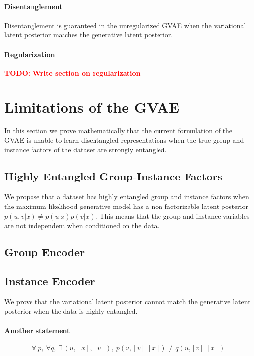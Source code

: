 \documentclass{article}
\newcommand{\todo}[1]{\textcolor{red}{\textbf{TODO: #1}}}
\begin{document}
\paragraph{Disentanglement} Disentanglement is guaranteed in the unregularized GVAE when the variational latent posterior matches the generative latent posterior.

\paragraph{Regularization}

\todo{Write section on regularization}

\section{Limitations of the GVAE}

In this section we prove mathematically that the current formulation of the GVAE is unable to learn disentangled representations when the true group and instance factors of the dataset are strongly entangled.

\subsection{Highly Entangled Group-Instance Factors}

We propose that a dataset has highly entangled group and instance factors when the maximum likelihood generative model has a non factorizable latent posterior $p(u, v | x) \neq p(u | x) p(v | x)$. This means that the group and instance variables are not independent when conditioned on the data.

\subsection{Group Encoder}

\subsection{Instance Encoder}

We prove that the variational latent posterior cannot match the generative latent posterior when the data is highly entangled.

\paragraph{Another statement} $$\forall ~ p,  ~ \forall q, ~ \exists ~ (u, [x], [v]), ~ p(u, [v] | [x]) \neq q(u, [v] | [x])$$
\end{document}
